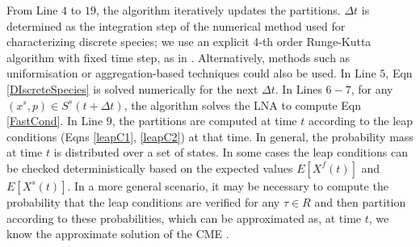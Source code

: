 \documentclass{llncs}
\begin{document}
From Line $4$ to $19$, 
the algorithm iteratively updates the partitions.
$\Delta t$ is determined as the integration step of the numerical method used for characterizing discrete species; we use an explicit 4-th order Runge-Kutta algorithm with fixed time step, as in \cite{henzinger2010hybrid}. Alternatively, 
methods such as uniformisation \cite{didier2009fast,Kwiatkowska2007} or aggregation-based techniques \cite{abate2015adaptive} could also be used. 
In Line $5$, Eqn \eqref{DIscreteSpecies} is solved numerically for the next $\Delta t$. %
In Lines $6-7$, for any $(x^s,p)\in S^s(t+\Delta t)$, the algorithm solves the LNA to compute Eqn \eqref{FastCond}. %
In Line $9$, the partitions are computed at time $t$ according to the leap conditions (Eqns \eqref{leapC1}, \eqref{leapC2}) at that time. In general, the probability mass at time $t$ is distributed over a set of states.
In some cases the leap conditions can be checked deterministically based on the expected values $E[X^f(t)]$ and $E[X^s(t)]$. 
In a more general scenario, it may be necessary to compute the probability that the leap conditions are verified for any $\tau \in R$ and then partition according to these probabilities, which can be approximated as, at time $t$, we know the approximate solution of the CME \cite{anderson2015models}.
\end{document}
